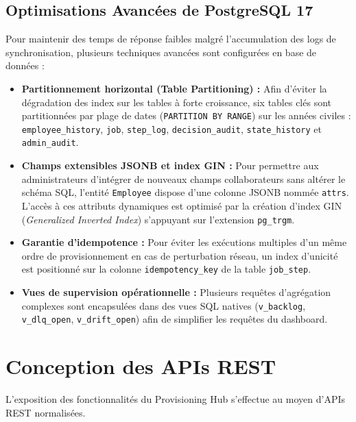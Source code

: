 \subsection{Optimisations Avancées de PostgreSQL 17}
Pour maintenir des temps de réponse faibles malgré l'accumulation des logs de synchronisation, plusieurs techniques avancées sont configurées en base de données :
\begin{itemize}
    \item \textbf{Partitionnement horizontal (Table Partitioning) :} Afin d'éviter la dégradation des index sur les tables à forte croissance, six tables clés sont partitionnées par plage de dates (\texttt{PARTITION BY RANGE}) sur les années civiles : \texttt{employee\_history}, \texttt{job}, \texttt{step\_log}, \texttt{decision\_audit}, \texttt{state\_history} et \texttt{admin\_audit}.
    \item \textbf{Champs extensibles JSONB et index GIN :} Pour permettre aux administrateurs d'intégrer de nouveaux champs collaborateurs sans altérer le schéma SQL, l'entité \texttt{Employee} dispose d'une colonne JSONB nommée \texttt{attrs}. L'accès à ces attributs dynamiques est optimisé par la création d'index GIN (\textit{Generalized Inverted Index}) s'appuyant sur l'extension \texttt{pg\_trgm}.
    \item \textbf{Garantie d'idempotence :} Pour éviter les exécutions multiples d'un même ordre de provisionnement en cas de perturbation réseau, un index d'unicité est positionné sur la colonne \texttt{idempotency\_key} de la table \texttt{job\_step}.
    \item \textbf{Vues de supervision opérationnelle :} Plusieurs requêtes d'agrégation complexes sont encapsulées dans des vues SQL natives (\texttt{v\_backlog}, \texttt{v\_dlq\_open}, \texttt{v\_drift\_open}) afin de simplifier les requêtes du dashboard.
\end{itemize}

\section{Conception des APIs REST}
L'exposition des fonctionnalités du Provisioning Hub s'effectue au moyen d'APIs REST normalisées.

